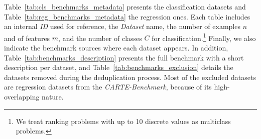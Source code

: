 Table~\ref{tab:cls_benchmarks_metadata} presents the classification datasets and Table~\ref{tab:reg_benchmarks_metadata} the regression ones. Each table includes an internal \textit{ID} used for reference, the \textit{Dataset} name, the number of examples $n$ and of features $m$, and the number of classes $C$ for classification.\footnote{We treat ranking problems with up to 10 discrete values as multiclass problems.} Finally, we also indicate the benchmark sources where each dataset appears. In addition, Table~\ref{tab:benchmarks_description} presents the full benchmark with a short description per dataset, and Table~\ref{tab:benchmarks_exclusion} details the datasets removed during the deduplication process. Most of the excluded datasets are regression datasets from the \textit{CARTE-Benchmark}, because of its high-overlapping nature. 



